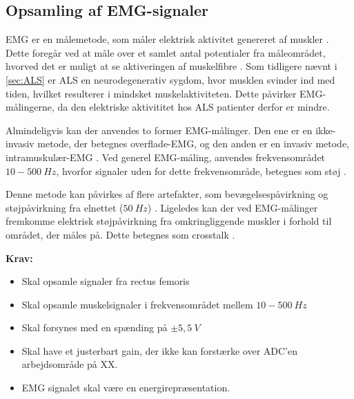 \subsection{Opsamling af EMG-signaler}
EMG er en målemetode, som måler elektrisk aktivitet genereret af muskler \citep{chowdhury2013}. 
Dette foregår ved at måle over et samlet antal potentialer fra måleområdet, hvorved det er muligt at se aktiveringen af muskelfibre \citep{keenan2012}. Som tidligere nævnt i \autoref{sec:ALS} er ALS en neurodegenerativ sygdom, hvor musklen svinder ind med tiden, hvilket resulterer i mindsket muskelaktiviteten. Dette påvirker EMG-målingerne, da den elektriske aktivititet hos ALS patienter derfor er mindre.

Almindeligvis kan der anvendes to former EMG-målinger. Den ene er en ikke-invasiv metode, der betegnes overflade-EMG, og den anden er en invasiv metode, intramuskulær-EMG \citep{chowdhury2013, keenan2012}.
Ved generel EMG-måling, anvendes frekvensområdet $10-500~Hz$, hvorfor signaler uden for dette frekvensområde, betegnes som støj \citep{morre2003, keenan2012}.  

Denne metode kan påvirkes af flere artefakter, som bevægelsespåvirkning og støjpåvirkning fra elnettet ($50~Hz$) \citep{keenan2012}.
Ligeledes kan der ved EMG-målinger fremkomme elektrisk støjpåvirkning fra omkringliggende muskler i forhold til området, der måles på. Dette betegnes som crosstalk \citep{keenan2012}. 
\vspace{3mm}

\textbf{Krav:}
\begin{itemize}
\item Skal opsamle signaler fra rectus femoris
\item Skal opsamle muskelsignaler i frekvensområdet mellem $10-500~Hz$
\item Skal forsynes med en spænding på $\pm5,5~V$ 
\item Skal have et justerbart gain, der ikke kan forstærke over ADC'en arbejdsområde på XX.
\item EMG signalet skal være en energirepræsentation.
\end{itemize}